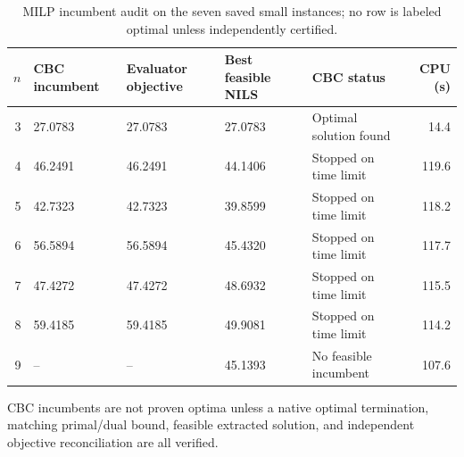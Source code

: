 \begin{table}[htbp]
\centering
\caption{MILP incumbent audit on the seven saved small instances; no row is labeled optimal unless independently certified.}
\label{tab:exact_milp_audit}
\small
\begin{tabular}{rllllr}
\toprule
$n$ & CBC incumbent & Evaluator objective & Best feasible NILS & CBC status & CPU (s) \\
\midrule
3 & 27.0783 & 27.0783 & 27.0783 & Optimal solution found & 14.4 \\
4 & 46.2491 & 46.2491 & 44.1406 & Stopped on time limit & 119.6 \\
5 & 42.7323 & 42.7323 & 39.8599 & Stopped on time limit & 118.2 \\
6 & 56.5894 & 56.5894 & 45.4320 & Stopped on time limit & 117.7 \\
7 & 47.4272 & 47.4272 & 48.6932 & Stopped on time limit & 115.5 \\
8 & 59.4185 & 59.4185 & 49.9081 & Stopped on time limit & 114.2 \\
9 & -- & -- & 45.1393 & No feasible incumbent & 107.6 \\
\bottomrule
\end{tabular}
\begin{flushleft}\footnotesize CBC incumbents are not proven optima unless a native optimal termination, matching primal/dual bound, feasible extracted solution, and independent objective reconciliation are all verified.\end{flushleft}
\end{table}
